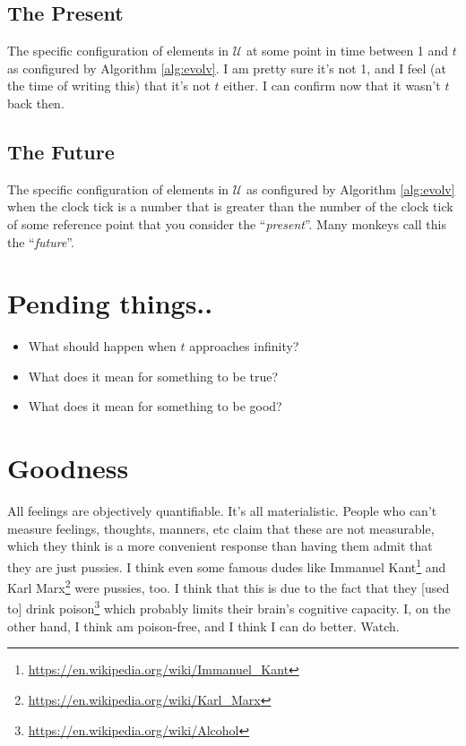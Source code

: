 \documentclass{report}
\begin{document}
\section{The Present}
The specific configuration of elements in $\mathcal{U}$ at some point in time between 1
and $t$ as configured by Algorithm \ref{alg:evolv}. I am pretty sure it's not 1,
and I feel (at the time of writing this) that it's not $t$ either. I can
confirm now that it wasn't $t$ back then.

\section{The Future}
The specific configuration of elements in $\mathcal{U}$ as configured by Algorithm
\ref{alg:evolv} when the clock tick is a number that is greater than the number
of the clock tick of some reference point that you consider the
``\emph{present}''. Many monkeys call this the ``\emph{future}''.

\chapter{Pending things..}
\begin{itemize}
    \item What should happen when $t$ approaches infinity?
    \item What does it mean for something to be true?
    \item What does it mean for something to be good?
\end{itemize}

\chapter{Goodness}
All feelings are objectively quantifiable. It's all materialistic.
People who can't measure feelings, thoughts, manners, etc claim that these are
not measurable, which they think is a more convenient response than having them
admit that they are just pussies. I think even some famous dudes like Immanuel
Kant\footnote{\url{https://en.wikipedia.org/wiki/Immanuel_Kant}} and Karl
Marx\footnote{\url{https://en.wikipedia.org/wiki/Karl_Marx}} were pussies, too.
I think that this is due to the fact that they [used to] drink
poison\footnote{\url{https://en.wikipedia.org/wiki/Alcohol}} which probably
limits their brain's cognitive capacity. I, on the other hand, I think am
poison-free, and I think I can do better.  Watch.
\end{document}
